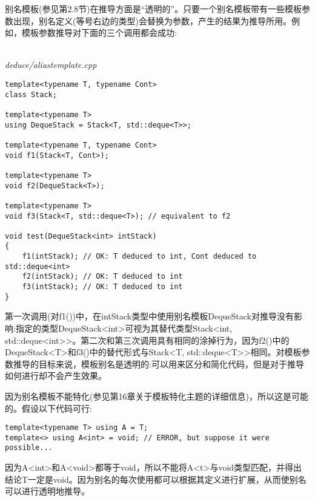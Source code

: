 别名模板(参见第2.8节)在推导方面是“透明的”。只要一个别名模板带有一些模板参数出现，别名定义(等号右边的类型)会替换为参数，产生的结果为推导所用。例如，模板参数推导对下面的三个调用都会成功:

\hspace*{\fill} \\ %
\noindent
\textit{deduce/aliastemplate.cpp}
\begin{lstlisting}[style=styleCXX]
template<typename T, typename Cont>
class Stack;

template<typename T>
using DequeStack = Stack<T, std::deque<T>>;

template<typename T, typename Cont>
void f1(Stack<T, Cont>);

template<typename T>
void f2(DequeStack<T>);

template<typename T>
void f3(Stack<T, std::deque<T>); // equivalent to f2

void test(DequeStack<int> intStack)
{
	f1(intStack); // OK: T deduced to int, Cont deduced to std::deque<int>
	f2(intStack); // OK: T deduced to int
	f3(intStack); // OK: T deduced to int
}
\end{lstlisting}

第一次调用(对f1())中，在intStack类型中使用别名模板DequeStack对推导没有影响:指定的类型DequeStack<int>可视为其替代类型Stack<int, std::deque<int>{}>。第二次和第三次调用具有相同的涂掉行为，因为f2()中的DequeStack<T>和f3()中的替代形式与Stack<T, std::deque<T>{}>相同。对模板参数推导的目标来说，模板别名是透明的:可以用来区分和简化代码，但是对于推导如何进行却不会产生效果。

因为别名模板不能特化(参见第16章关于模板特化主题的详细信息)，所以这是可能的。假设以下代码可行:

\begin{lstlisting}[style=styleCXX]
template<typename T> using A = T;
template<> using A<int> = void; // ERROR, but suppose it were possible...
\end{lstlisting}

因为A<int>和A<void>都等于void，所以不能将A<t>与void类型匹配，并得出结论T一定是void。因为别名的每次使用都可以根据其定义进行扩展，从而使别名可以进行透明地推导。


























